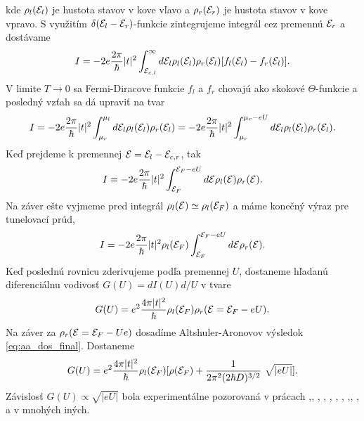 kde $\rho_l(\mathcal{E}_l)$  je hustota stavov v kove vľavo a $\rho_r(\mathcal{E}_r)$ je hustota stavov v kove vpravo. S využitím $\delta(\mathcal{E}_l-\mathcal{E}_r)$-funkcie zintegrujeme integrál cez premennú $\mathcal{E}_r$ a dostávame
\begin{equation}
I= -2e \frac{2\pi}{\hbar} |t|^{2} \int_{\mathcal{E}_{c,l}}^\infty d\mathcal{E}_l \rho_l(\mathcal{E}_l)\rho_r(\mathcal{E}_l) [f_l(\mathcal{E}_l) -  f_r(\mathcal{E}_l)] \text{.}
\end{equation}
V limite $T \rightarrow 0$ sa Fermi-Diracove funkcie $f_l$ a $f_r$ chovajú ako skokové $\Theta$-funkcie a posledný vzťah sa dá upraviť na tvar
\begin{equation}
I= -2e \frac{2\pi}{\hbar} |t|^{2} \int_{\mu_{r}}^{\mu_{l}} d\mathcal{E}_l \rho_l(\mathcal{E}_l)\rho_r(\mathcal{E}_l) =  -2e \frac{2\pi}{\hbar} |t|^{2}  \int_{\mu_{r}}^{\mu_{r}-eU} d\mathcal{E}_l  \rho_l(\mathcal{E}_l) \rho_r(\mathcal{E}_l) \text{.}
\end{equation}
Keď prejdeme k premennej $ \mathcal{E} = \mathcal{E}_l - \mathcal{E}_{c,r}$, tak
\begin{equation}
I=  -2e \frac{2\pi}{\hbar} |t|^{2}  \int_{\mathcal{E}_{F}}^{\mathcal{E}_{F}-eU} d\mathcal{E}  \rho_l(\mathcal{E}) \rho_r(\mathcal{E}) \text{.}
\end{equation}
Na záver ešte vyjmeme pred integrál $\rho_l(\mathcal{E}) \simeq \rho_l(\mathcal{E}_F)$ a máme konečný výraz pre tunelovací prúd,
\begin{equation}
\label{eq:02current4}
I =  -2e \frac{2\pi}{\hbar} |t|^{2} \rho_l(\mathcal{E}_F) \int_{\mathcal{E}_{F}}^{\mathcal{E}_{F}-eU} d\mathcal{E}   \rho_r(\mathcal{E}) \text{.}
\end{equation}
Keď poslednú rovnicu zderivujeme podľa premennej $U$, dostaneme hľadanú diferenciálnu vodivosť $G(U) = dI(U)d/U$ v tvare
\begin{align}
\label{eq:02diff}
G(U)=e^2\frac{4\pi|t|^2}{\hbar}\rho_l(\mathcal{E}_F)\rho_r(\mathcal{E}=\mathcal{E}_F-eU) \text{.}
\end{align}
Na záver za $\rho_r(\mathcal{E}=\mathcal{E}_F-Ue)$ dosadíme Altshuler-Aronovov výsledok  \eqref{eq:aa_dos_final}. Dostaneme
\begin{align}
\label{eq:02diff_2}
G(U)=e^2\frac{4\pi|t|^2}{\hbar}\rho_l(\mathcal{E}_F)[\rho(\mathcal{E}_F)+  \frac{1}{2\pi^2 (2\hbar D)^{3/2}}  \ \sqrt{|eU|}] \text{.}
\end{align}
Závislosť $G(U) \propto  \sqrt{|eU|} $ bola experimentálne pozorovaná v prácach \cite{Abeles},\cite{Dynes},\cite{McMillan2}
\cite{ImryOvadyahu}, \cite{Schmitz1}, \cite{Schmitz2}, \cite{Escudero}, \cite{Teizer}, \cite{Mazur},\cite{Luna2014}, \cite{Luna2015},
a v mnohých iných.

